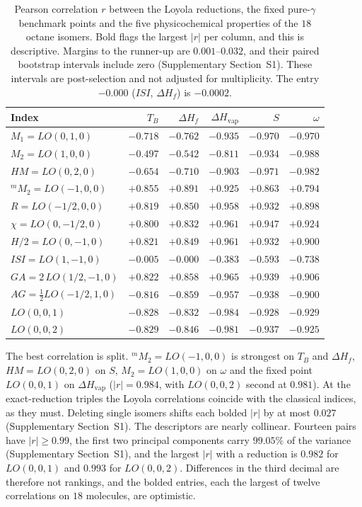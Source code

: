 \documentclass[a5paper, 10pt]{article}
\theoremstyle{plain}
\theoremstyle{remark}
\theoremstyle{definition}
\begin{document}
\begin{table}[htbp]
\centering
\caption{Pearson correlation $r$ between the Loyola reductions, the fixed pure-$\gamma$ benchmark points and the five physicochemical properties of the $18$ octane isomers. Bold flags the largest $|r|$ per column, and this is descriptive. Margins to the runner-up are $0.001$--$0.032$, and their paired bootstrap intervals include zero (Supplementary Section~S1). These intervals are post-selection and not adjusted for multiplicity. The entry $-0.000$ ($ISI$, $\Delta H_f$) is $-0.0002$.}
\label{tab:lo_octane}
\small
\begin{tabular}{lrrrrr}
\toprule
Index & $T_B$ & $\Delta H_f$ & $\Delta H_{\mathrm{vap}}$ & $S$ & $\omega$\\
\midrule
$M_1 = LO(0,1,0)$ & $-0.718$ & $-0.762$ & $-0.935$ & $-0.970$ & $-0.970$\\
$M_2 = LO(1,0,0)$ & $-0.497$ & $-0.542$ & $-0.811$ & $-0.934$ & $\mathbf{-0.988}$\\
$HM = LO(0,2,0)$ & $-0.654$ & $-0.710$ & $-0.903$ & $\mathbf{-0.971}$ & $-0.982$\\
${}^{m}\!M_2 = LO(-1,0,0)$ & $\mathbf{+0.855}$ & $\mathbf{+0.891}$ & $+0.925$ & $+0.863$ & $+0.794$\\
$R = LO(-1/2,0,0)$ & $+0.819$ & $+0.850$ & $+0.958$ & $+0.932$ & $+0.898$\\
$\chi = LO(0,-1/2,0)$ & $+0.800$ & $+0.832$ & $+0.961$ & $+0.947$ & $+0.924$\\
$H/2 = LO(0,-1,0)$ & $+0.821$ & $+0.849$ & $+0.961$ & $+0.932$ & $+0.900$\\
$ISI = LO(1,-1,0)$ & $-0.005$ & $-0.000$ & $-0.383$ & $-0.593$ & $-0.738$\\
$GA = 2\,LO(1/2,-1,0)$ & $+0.822$ & $+0.858$ & $+0.965$ & $+0.939$ & $+0.906$\\
$AG = \tfrac12 LO(-1/2,1,0)$ & $-0.816$ & $-0.859$ & $-0.957$ & $-0.938$ & $-0.900$\\
$LO(0,0,1)$ & $-0.828$ & $-0.832$ & $\mathbf{-0.984}$ & $-0.928$ & $-0.929$\\
$LO(0,0,2)$ & $-0.829$ & $-0.846$ & $-0.981$ & $-0.937$ & $-0.925$\\
\bottomrule
\end{tabular}
\end{table}

The best correlation is split. ${}^{m}\!M_2 = LO(-1, 0, 0)$ is
strongest on $T_B$ and $\Delta H_f$, $HM = LO(0, 2, 0)$ on $S$,
$M_2 = LO(1, 0, 0)$ on $\omega$ and the fixed point $LO(0, 0, 1)$ on
$\Delta H_{\mathrm{vap}}$ ($|r| = 0.984$, with $LO(0, 0, 2)$ second at
$0.981$). At the exact-reduction triples the Loyola correlations
coincide with the classical indices, as they must. Deleting single
isomers shifts each bolded $|r|$ by at most $0.027$ (Supplementary
Section~S1). The descriptors are nearly collinear. Fourteen pairs have
$|r| \ge 0.99$, the first two principal components carry $99.05\%$ of
the variance (Supplementary Section~S1), and the largest $|r|$ with a
reduction is $0.982$ for $LO(0, 0, 1)$ and $0.993$ for $LO(0, 0, 2)$.
Differences in the third decimal are therefore not rankings, and the
bolded entries, each the largest of twelve correlations on $18$
molecules, are optimistic.
\end{document}

